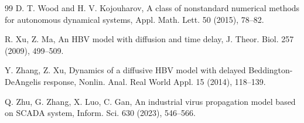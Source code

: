 \documentclass[11pt]{article}
\theoremstyle{definition}
\theoremstyle{remark}
\numberwithin{equation}{section}
\begin{document}
\begin{thebibliography}{99}
D. T. Wood and H. V. Kojouharov, 
A class of nonstandard numerical methods for autonomous dynamical systems, 	
Appl. Math. Lett. {50} (2015), 78--82.

R. Xu, Z. Ma, 
An HBV model with diffusion and time delay, 
J. Theor. Biol. 257 (2009), 499--509.

Y. Zhang, Z. Xu, 
Dynamics of a diffusive HBV model with delayed Beddington-DeAngelis response, 
Nonlin. Anal. Real World Appl. 15 (2014), 118--139.

Q. Zhu, G. Zhang, X. Luo, C. Gan, 
An industrial virus propagation model based on SCADA system, 
Inform. Sci. 630 (2023), 546--566.

\end{thebibliography}
\end{document}

